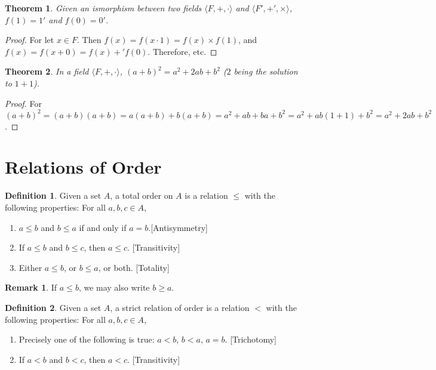 \documentclass[oneside]{book}
\newtheorem{theorem}{Theorem}[section]
\theoremstyle{definition}
\newtheorem{definition}{Definition}[section]
\newtheorem{remark}{Remark}[section]
\begin{document}
\begin{theorem}
Given an ismorphism between two fields $\langle F,+,\cdot \rangle$ and $\langle F', +',\times \rangle$, $f(1) = 1'$ and $f(0) = 0'$.
\end{theorem}
\begin{proof}
For let $x\in F$. Then $f(x)=f(x\cdot 1) = f(x)\times f(1)$, and $f(x)=f(x+0) = f(x)+'f(0)$. Therefore, etc.
\end{proof}

\begin{theorem}
In a field $\langle F,+,\cdot \rangle$, $(a+ b)^2 = a^2 + 2ab + b^2$ ($2$ being the solution to $1+1$).
\end{theorem}
\begin{proof}
For $(a+b)^2 = (a+b)(a+b) = a(a+b)+b(a+b) = a^2 + ab + ba + b^2 = a^2 +ab(1+1)+b^2 = a^2 + 2ab + b^2$.
\end{proof}

\section{Relations of Order}

\begin{definition}
Given a set $A$, a total order on $A$ is a relation $\leq$ with the following properties: For all $a,b,c\in A$,
\begin{enumerate}
\item $a\leq b$ and $b\leq a$ if and only if $a=b$.\hfill [Antisymmetry]
\item If $a\leq b$ and $b\leq c$, then $a\leq c$. \hfill [Transitivity]
\item Either $a\leq b$, or $b\leq a$, or both. \hfill [Totality]
\end{enumerate}
\end{definition}

\begin{remark}
If $a\leq b$, we may also write $b\geq a$.
\end{remark}

\begin{definition}
Given a set $A$, a strict relation of order is a relation $<$ with the following properties: For all $a,b,c\in A$,
\begin{enumerate}
\item Precisely one of the following is true: $a<b$, $b<a$, $a=b$. \hfill [Trichotomy]
\item If $a<b$ and $b<c$, then $a<c$. \hfill [Transitivity]
\end{enumerate}
\end{definition}
\end{document}
